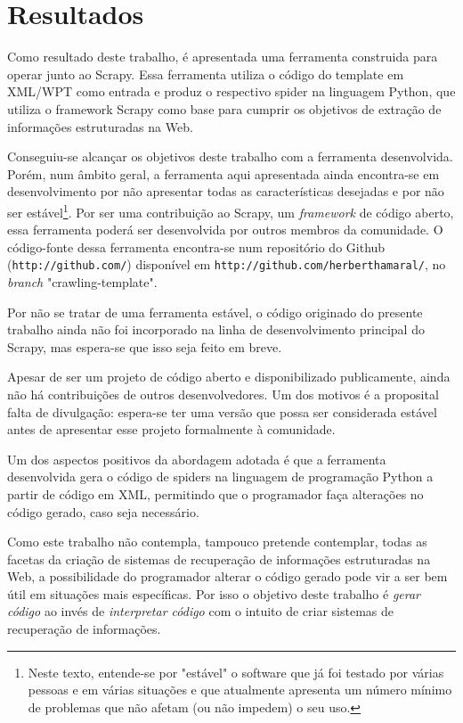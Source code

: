 \chapter{Resultados}
\thispagestyle{fancy}

Como resultado deste trabalho, é apresentada uma ferramenta construida para operar junto ao Scrapy. Essa ferramenta utiliza o código do template em XML/WPT como entrada e produz o respectivo spider na linguagem Python, que utiliza o framework Scrapy como base para cumprir os objetivos de extração de informações estruturadas na Web.


Conseguiu-se alcançar os objetivos deste trabalho com a ferramenta desenvolvida. Porém, num âmbito geral, a ferramenta aqui apresentada ainda encontra-se em desenvolvimento por não apresentar todas as características desejadas e por não ser estável\footnote{Neste texto, entende-se por "estável" o software que já foi testado por várias pessoas e em várias situações e que atualmente apresenta um número mínimo de problemas que não afetam (ou não impedem) o seu uso.}. Por ser uma contribuição ao Scrapy, um \textit{framework} de código aberto, essa ferramenta poderá ser desenvolvida por outros membros da comunidade. O código-fonte dessa ferramenta encontra-se num repositório do Github (\texttt{http://github.com/}) disponível em \texttt{http://github.com/herberthamaral/}, no \emph{branch} "crawling-template".

Por não se tratar de uma ferramenta estável, o código originado do presente trabalho ainda não foi incorporado na linha de desenvolvimento principal do Scrapy, mas espera-se que isso seja feito em breve.

Apesar de ser um projeto de código aberto e disponibilizado publicamente, ainda não há contribuições de outros desenvolvedores. Um dos motivos é a proposital falta de divulgação: espera-se ter uma versão que possa ser considerada estável antes de apresentar esse projeto formalmente à comunidade.

Um dos aspectos positivos da abordagem adotada é que a ferramenta desenvolvida gera o código de spiders na linguagem de programação Python a partir de código em XML, permitindo que o programador faça alterações no código gerado, caso seja necessário. 

Como este trabalho não contempla, tampouco pretende contemplar, todas as facetas da criação de sistemas de recuperação de informações estruturadas na Web, a possibilidade do programador alterar o código gerado pode vir a ser bem útil em situações mais específicas. Por isso o objetivo deste trabalho é \emph{gerar código} ao invés de \emph{interpretar código} com o intuito de criar sistemas de recuperação de informações.

